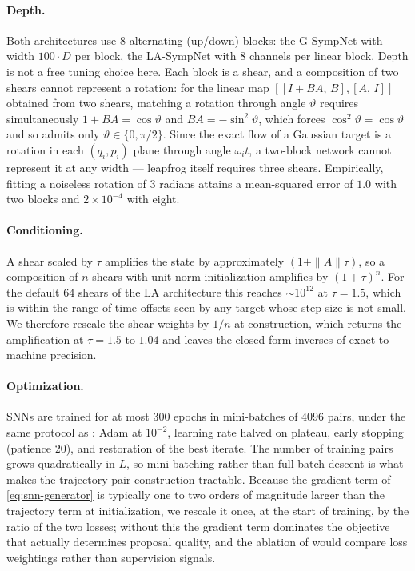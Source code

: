\documentclass{article}
\theoremstyle{plain}
\theoremstyle{definition}
\theoremstyle{remark}
\begin{document}
\paragraph{Depth.} Both architectures use $8$ alternating (up/down) blocks:
the G-SympNet with width $100 \cdot D$ per block, the LA-SympNet with $8$
channels per linear block. Depth is not a free tuning choice here. Each block
is a shear, and a composition of two shears cannot represent a rotation: for
the linear map $[[I + BA,\, B],[A,\, I]]$ obtained from two shears, matching a
rotation through angle $\vartheta$ requires simultaneously $1 + BA =
\cos\vartheta$ and $BA = -\sin^2\vartheta$, which forces
$\cos^2\vartheta = \cos\vartheta$ and so admits only
$\vartheta \in \{0, \pi/2\}$. Since the exact flow of a Gaussian target is a
rotation in each $(q_i,p_i)$ plane through angle $\omega_i t$, a two-block
network cannot represent it at any width --- leapfrog itself requires three
shears. Empirically, fitting a noiseless rotation of $3$ radians attains a
mean-squared error of $1.0$ with two blocks and $2 \times 10^{-4}$ with eight.

\paragraph{Conditioning.} A shear scaled by $\tau$ amplifies the state by
approximately $(1 + \|A\| \tau)$, so a composition of $n$ shears with unit-norm
initialization amplifies by $(1+\tau)^{n}$. For the default $64$ shears of the
LA architecture this reaches $\sim\!10^{12}$ at $\tau = 1.5$, which is within
the range of time offsets seen by any target whose step size is not small. We
therefore rescale the shear weights by $1/n$ at construction, which returns
the amplification at $\tau = 1.5$ to $1.04$ and leaves the closed-form
inverses of  exact to machine precision.

\paragraph{Optimization.} SNNs are trained for at most $300$ epochs in
mini-batches of $4096$ pairs, under the same protocol as
: Adam at $10^{-2}$, learning rate halved on plateau,
early stopping (patience $20$), and restoration of the best iterate. The
number of training pairs grows quadratically in $L$, so mini-batching rather
than full-batch descent is what makes the trajectory-pair construction
tractable. Because the gradient term of \eqref{eq:snn-generator} is typically
one to two orders of magnitude larger than the trajectory term at
initialization, we rescale it once, at the start of training, by the ratio of
the two losses; without this the gradient term dominates the objective that
actually determines proposal quality, and the ablation of
 would compare loss weightings rather than
supervision signals.
\end{document}
